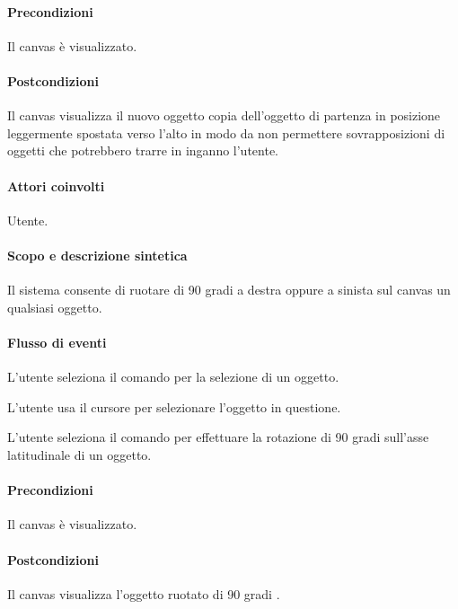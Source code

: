 \paragraph{Precondizioni} Il canvas \`e visualizzato. 
\paragraph{Postcondizioni} Il canvas visualizza il nuovo oggetto copia dell'oggetto di partenza in posizione leggermente spostata verso l'alto in modo da non permettere sovrapposizioni di oggetti che potrebbero trarre in inganno l'utente.

\paragraph{Attori coinvolti} Utente.
\paragraph{Scopo e descrizione sintetica} Il sistema consente di ruotare di 90 gradi a destra oppure a sinista sul canvas un qualsiasi oggetto.
\paragraph{Flusso di eventi}
\begin{elenconumerato}[\textbf{}]{\subsubsecindent}
\item  L'utente seleziona il comando per la selezione di un oggetto.
\item  L'utente usa il cursore per selezionare l'oggetto in questione.
\item  L'utente seleziona il comando per effettuare la rotazione di 90 gradi sull'asse latitudinale di un oggetto.
\end{elenconumerato}
\paragraph{Precondizioni} Il canvas \`e visualizzato. 
\paragraph{Postcondizioni} Il canvas visualizza l'oggetto ruotato di 90 gradi .

